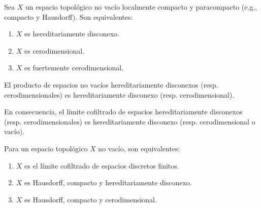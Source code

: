 \documentclass[topologia-analisis.tex]{subfiles}
\begin{document}
\begin{cor}
	Sea $X$ un espacio topológico no vacío localmente compacto y paracompacto (e.g., compacto y Hausdorff). Son equivalentes:
	\begin{enumerate}
		\item $X$ es hereditariamente disconexo.
		\item $X$ es cerodimensional.
		\item $X$ es fuertemente cerodimensional.
	\end{enumerate}
\end{cor}

\begin{thm}
	El producto de espacios no vacíos hereditariamente disconexos (resp. cerodimensionales) es hereditariamente disconexo (resp. cerodimensional).

	En consecuencia, el límite cofiltrado de espacios hereditariamente disconexos (resp. cerodimensionales) es
	hereditariamente disconexo (resp. cerodimensional o vacío).
\end{thm}
\begin{thm}
	Para un espacio topológico $X$ no vacío, son equivalentes:
	\begin{enumerate}
		\item $X$ es el límite cofiltrado de espacios discretos finitos.
		\item $X$ es Hausdorff, compacto y hereditariamente disconexo.
		\item $X$ es Hausdorff, compacto y cerodimensional.
	\end{enumerate}
\end{thm}
\end{document}
